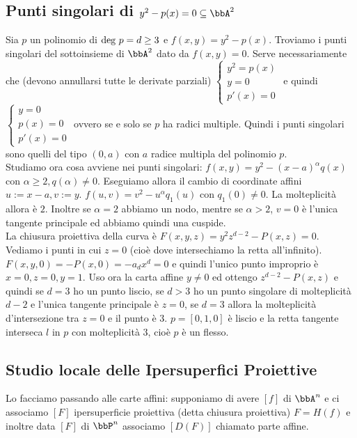 \documentclass[a4paper,NoNotes,GeneralMath]{stdmdoc}
\begin{document}
	\subsection*{Punti singolari di $y^2 - p(x) = 0 \subseteq \bbA^2$}
	Sia $p$ un polinomio di $\mbox{deg } p = d \ge 3$ e $f(x,y) = y^2 - p(x)$. Troviamo i punti singolari del sottoinsieme di $\bbA^2$ dato da $f(x,y) = 0$. Serve necessariamente che (devono annullarsi tutte le derivate parziali) $\left\{ \begin{array}{c} y^2 = p(x) \\ y = 0 \\ p'(x) = 0 \end{array} \right.$ e quindi $\left\{ \begin{array}{c} y=0 \\ p(x) = 0 \\ p'(x) = 0 \end{array} \right.$ ovvero se e solo se $p$ ha radici multiple. Quindi i punti singolari sono quelli del tipo $(0,a)$ con $a$ radice multipla del polinomio $p$. \\
	Studiamo ora cosa avviene nei punti singolari: $f(x,y) = y^2 - (x-a)^\alpha q(x)$ con $\alpha \ge 2, q(\alpha) \neq 0$. Eseguiamo allora il cambio di coordinate affini $u := x - a, v := y$. $f(u,v) = v^2 - u^\alpha q_1(u)$ con $q_1(0) \neq 0$. La molteplicità allora è $2$. Inoltre se $\alpha = 2$ abbiamo un nodo, mentre se $\alpha > 2$, $v=0$ è l'unica tangente principale ed abbiamo quindi una cuspide. \\
	La chiusura proiettiva della curva è $F(x,y,z) = y^2z^{d-2} - P(x,z) = 0$. Vediamo i punti in cui $z = 0$ (cioè dove intersechiamo la retta all'infinito). $F(x,y,0) = - P(x, 0) = - a_d x^d = 0$ e quindi l'unico punto improprio è $x = 0, z = 0, y = 1$. Uso ora la carta affine $y \neq 0$ ed ottengo $z^{d-2} - P(x,z)$ e quindi se $d=3$ ho un punto liscio, se $d>3$ ho un punto singolare di molteplicità $d-2$ e l'unica tangente principale è $z=0$, se $d=3$ allora la molteplicità d'intersezione tra $z=0$ e il punto è $3$. $p = [0,1,0]$ è liscio e la retta tangente interseca $l$ in $p$ con molteplicità $3$, cioè $p$ è un flesso.
	
	\subsection*{Studio locale delle Ipersuperfici Proiettive}
	Lo facciamo passando alle carte affini: supponiamo di avere $[f]$ di $\bbA^n$ e ci associamo $[F]$ ipersuperficie proiettiva (detta chiusura proiettiva) $F = H(f)$ e inoltre data $[F]$ di $\bbP^n$ associamo $[D(F)]$ chiamato parte affine.
	
\end{document}
